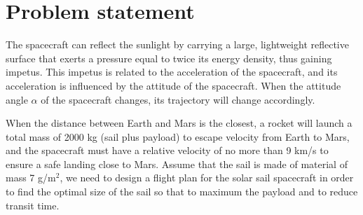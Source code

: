 \documentclass[../Paper.tex]{subfiles}
\begin{document}
\section{Problem statement}

The spacecraft can reflect the sunlight by carrying a large, lightweight reflective surface that exerts a pressure equal to twice its energy density, thus gaining impetus. This impetus is related to the acceleration of the spacecraft, and its acceleration is influenced by the attitude of the spacecraft. When the attitude angle $\alpha$ of the spacecraft changes, its trajectory will change accordingly. 

When the distance between Earth and Mars is the closest, a rocket will launch a total mass of 2000 kg (sail plus payload) to escape velocity from Earth to Mars, and the spacecraft must have a relative velocity of no more than 9 km/s to ensure a safe landing close to Mars. Assume that the sail is made of material of mass 7 g/m$^2$, we need to design a flight plan for the solar sail spacecraft in order to find the optimal size of the sail so that to maximum the payload and to reduce transit time.
\end{document}
